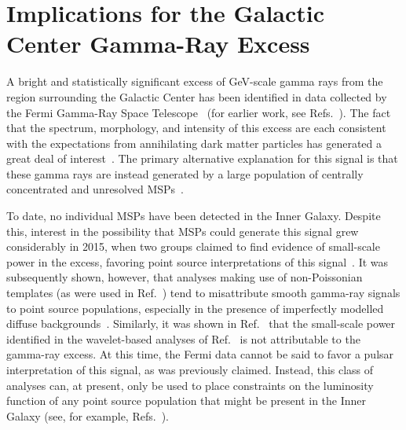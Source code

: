 \documentclass[aps,prd,twocolumn,amsmath,superscriptaddress,amssymb,showpacs,floatfix,nofootinbib,longbibliography,preprintnumbers]{revtex4-1}
\begin{document}
\section{Implications for the Galactic Center Gamma-Ray Excess}

A bright and statistically significant excess of GeV-scale gamma rays from the region surrounding the Galactic Center has been identified in data collected by the Fermi Gamma-Ray Space Telescope~\cite{Daylan:2014rsa,TheFermi-LAT:2017vmf} (for earlier work, see Refs.~\cite{Goodenough:2009gk,Hooper:2010mq,Hooper:2011ti,Abazajian:2012pn,Hooper:2013rwa,Gordon:2013vta,Calore:2014xka,TheFermi-LAT:2015kwa}). The fact that the spectrum, morphology, and intensity of this excess are each consistent with the expectations from annihilating dark matter particles has generated a great deal of interest~\cite{Berlin:2014tja,Berlin:2014pya,Abdullah:2014lla,Hooper:2012cw,Martin:2014sxa,McDermott:2014rqa,Cahill-Rowley:2014ora,Hooper:2014fda,Liu:2014cma,Caron:2015wda,Berlin:2015wwa,Cline:2015qha,Bertone:2015tza,Fonseca:2015rwa,Freese:2015ysa,Alves:2014yha,Agrawal:2014una,Izaguirre:2014vva,Ipek:2014gua,Tang:2015coo,Escudero:2016kpw,Escudero:2017yia}. The primary alternative explanation for this signal is that these gamma rays are instead generated by a large population of centrally concentrated and unresolved MSPs~\cite{Hooper:2010mq,Abazajian:2010zy,Hooper:2011ti,Abazajian:2012pn,Hooper:2013rwa,Gordon:2013vta, Lee:2015fea, Bartels:2015aea}. 

To date, no individual MSPs have been detected in the Inner Galaxy. Despite this, interest in the possibility that MSPs could generate this signal grew considerably in 2015, when two groups claimed to find evidence of small-scale power in the excess, favoring point source interpretations of this signal~\cite{Lee:2015fea,Bartels:2015aea}. It was subsequently shown, however, that analyses making use of non-Poissonian templates (as were used in Ref.~\cite{Lee:2015fea}) tend to misattribute smooth gamma-ray signals to point source populations, especially in the presence of imperfectly modelled diffuse backgrounds~\cite{Leane:2019xiy, Leane:2020pfc,Leane:2020nmi}. Similarly, it was shown in Ref.~\cite{Zhong:2019ycb} that the small-scale power identified in the wavelet-based analyses of Ref.~\cite{Bartels:2015aea} is not attributable to the gamma-ray excess. At this time, the Fermi data cannot be said to favor a pulsar interpretation of this signal, as was previously claimed. Instead, this class of analyses can, at present, only be used to place constraints on the luminosity function of any point source population that might be present in the Inner Galaxy (see, for example, Refs.~\cite{List:2020mzd,Calore:2021bty}).
\end{document}
